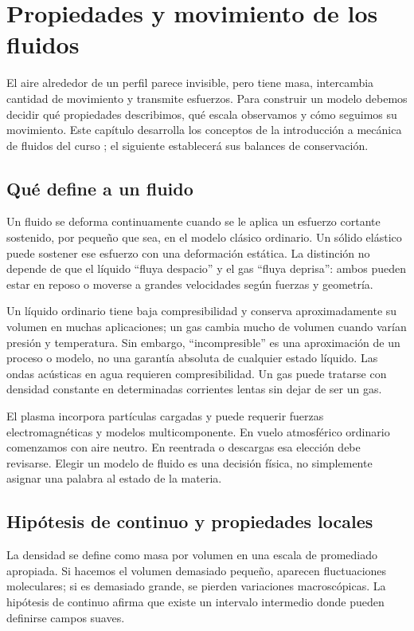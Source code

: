 \chapter{Propiedades y movimiento de los fluidos}\label{ch:06}

El aire alrededor de un perfil parece invisible, pero tiene masa, intercambia cantidad de movimiento y transmite esfuerzos. Para construir un modelo debemos decidir qué propiedades describimos, qué escala observamos y cómo seguimos su movimiento. Este capítulo desarrolla los conceptos de la introducción a mecánica de fluidos del curso \cite{TAE3}; el siguiente establecerá sus balances de conservación.

\section{Qué define a un fluido}
Un fluido se deforma continuamente cuando se le aplica un esfuerzo cortante sostenido, por pequeño que sea, en el modelo clásico ordinario. Un sólido elástico puede sostener ese esfuerzo con una deformación estática. La distinción no depende de que el líquido ``fluya despacio'' y el gas ``fluya deprisa'': ambos pueden estar en reposo o moverse a grandes velocidades según fuerzas y geometría.

Un líquido ordinario tiene baja compresibilidad y conserva aproximadamente su volumen en muchas aplicaciones; un gas cambia mucho de volumen cuando varían presión y temperatura. Sin embargo, ``incompresible'' es una aproximación de un proceso o modelo, no una garantía absoluta de cualquier estado líquido. Las ondas acústicas en agua requieren compresibilidad. Un gas puede tratarse con densidad constante en determinadas corrientes lentas sin dejar de ser un gas.

El plasma incorpora partículas cargadas y puede requerir fuerzas electromagnéticas y modelos multicomponente. En vuelo atmosférico ordinario comenzamos con aire neutro. En reentrada o descargas esa elección debe revisarse. Elegir un modelo de fluido es una decisión física, no simplemente asignar una palabra al estado de la materia.

\section{Hipótesis de continuo y propiedades locales}
La densidad se define como masa por volumen en una escala de promediado apropiada. Si hacemos el volumen demasiado pequeño, aparecen fluctuaciones moleculares; si es demasiado grande, se pierden variaciones macroscópicas. La hipótesis de continuo afirma que existe un intervalo intermedio donde pueden definirse campos suaves.

